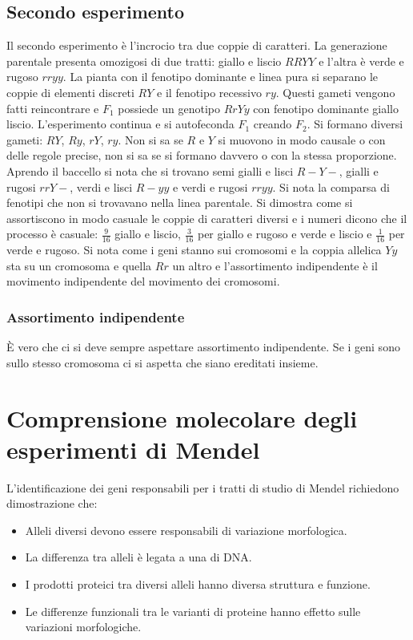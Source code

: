 \subsection{Secondo esperimento}
Il secondo esperimento \`e l'incrocio tra due coppie di caratteri. La generazione parentale presenta omozigosi di due tratti: giallo e liscio $RRYY$ e l'altra \`e verde e rugoso
$rryy$. La pianta con il fenotipo dominante e linea pura si separano le coppie di elementi discreti $RY$ e il fenotipo recessivo $ry$. Questi gameti vengono fatti reincontrare e 
$F_1$ possiede un genotipo $RrYy$ con fenotipo dominante giallo liscio. L'esperimento continua e si autofeconda $F_1$ creando $F_2$. Si formano diversi gameti: $RY$, $Ry$, $rY$, $ry$. 
Non si sa se $R$ e $Y$ si muovono in modo causale o con delle regole precise, non si sa se si formano davvero o con la stessa proporzione. Aprendo il baccello si nota
che si trovano semi gialli e lisci $R-Y-$, gialli e rugosi $rrY-$, verdi e lisci $R-yy$ e verdi e rugosi $rryy$. Si nota la comparsa di fenotipi che non si trovavano nella linea 
parentale. Si dimostra come si assortiscono in modo casuale le coppie di caratteri diversi e i numeri dicono che il processo \`e casuale: $\frac{9}{16}$ giallo e liscio, $\frac{3}{16}$
per giallo e rugoso e verde e liscio e $\frac{1}{16}$ per verde e rugoso. Si nota come i geni stanno sui cromosomi e la coppia allelica $Yy$ sta su un cromosoma e quella $Rr$ un
altro e l'assortimento indipendente \`e il movimento indipendente del movimento dei cromosomi. 
\subsubsection{Assortimento indipendente}
\`E vero che ci si deve sempre aspettare assortimento indipendente. Se i geni sono sullo stesso cromosoma ci si aspetta che siano ereditati insieme. 
\section{Comprensione molecolare degli esperimenti di Mendel}
L'identificazione dei geni responsabili per i tratti di studio di Mendel richiedono dimostrazione che:
\begin{itemize}
	\item Alleli diversi devono essere responsabili di variazione morfologica.
	\item La differenza tra alleli \`e legata a una di DNA. 
	\item I prodotti proteici tra diversi alleli hanno diversa struttura e funzione. 
	\item Le differenze funzionali tra le varianti di proteine hanno effetto sulle variazioni morfologiche.
\end{itemize}

